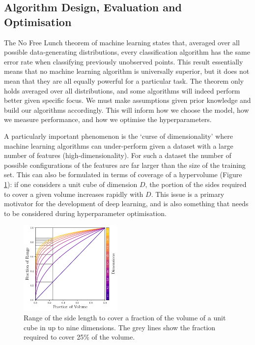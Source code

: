\subsection{Algorithm Design, Evaluation and Optimisation}

The No Free Lunch theorem of machine learning \cite{NoFreeLunch} states that, averaged over all possible data-generating distributions, every classification algorithm has the same error rate when classifying previously unobserved points.
This result essentially means that no machine learning algorithm is universally superior, but it does not mean that they are all equally powerful for a particular task. 
The theorem only holds averaged over all distributions, and some algorithms will indeed perform better given specific focus. We must make assumptions given prior knowledge and build our algorithms accordingly.
This will inform how we choose the model, how we measure performance, and how we optimise the hyperparameters. 


A particularly important phenomenon is the `curse of dimensionality' \cite{elementsOfStatsLearning} where machine learning algorithms can under-perform given a dataset with a large number of features (high-dimensionality).
For such a dataset the number of possible configurations of the features are far larger than the size of the training set. 
This can also be formulated in terms of coverage of a hypervolume (Figure \ref{fig:machine_learning:curse_of_dimensionality}): if one considers a unit cube of dimension $D$, the portion of the sides required to cover a given volume increases rapidly with $D$.
This issue is a primary motivator for the development of deep learning, and is also something that needs to be considered during hyperparameter optimisation. 
\begin{figure}[h!]
    \begin{center}
        \includegraphics[width=0.45\textwidth]{figures/machine_learning/curse_of_dimensionality.pdf}
    \end{center}
    \caption{Range of the side length to cover a fraction of the volume of a unit cube in up to nine dimensions. The grey lines show the fraction required to cover 25\% of the volume.}
        \label{fig:machine_learning:curse_of_dimensionality}
\end{figure}


